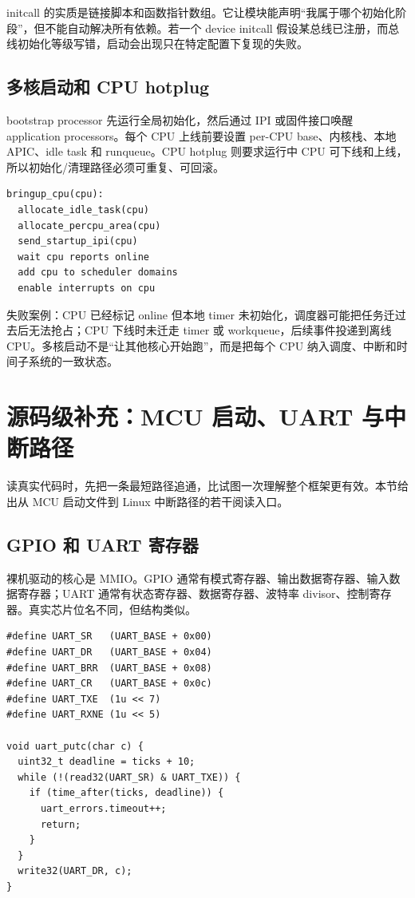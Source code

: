 initcall 的实质是链接脚本和函数指针数组。它让模块能声明“我属于哪个初始化阶段”，但不能自动解决所有依赖。若一个 device initcall 假设某总线已注册，而总线初始化等级写错，启动会出现只在特定配置下复现的失败。

\subsection{多核启动和 CPU hotplug}

bootstrap processor 先运行全局初始化，然后通过 IPI 或固件接口唤醒 application processors。每个 CPU 上线前要设置 per-CPU base、内核栈、本地 APIC、idle task 和 runqueue。CPU hotplug 则要求运行中 CPU 可下线和上线，所以初始化/清理路径必须可重复、可回滚。

\begin{lstlisting}
bringup_cpu(cpu):
  allocate_idle_task(cpu)
  allocate_percpu_area(cpu)
  send_startup_ipi(cpu)
  wait cpu reports online
  add cpu to scheduler domains
  enable interrupts on cpu
\end{lstlisting}

失败案例：CPU 已经标记 online 但本地 timer 未初始化，调度器可能把任务迁过去后无法抢占；CPU 下线时未迁走 timer 或 workqueue，后续事件投递到离线 CPU。多核启动不是“让其他核心开始跑”，而是把每个 CPU 纳入调度、中断和时间子系统的一致状态。

\section{源码级补充：MCU 启动、UART 与中断路径}

读真实代码时，先把一条最短路径追通，比试图一次理解整个框架更有效。本节给出从 MCU 启动文件到 Linux 中断路径的若干阅读入口。

\subsection{GPIO 和 UART 寄存器}

裸机驱动的核心是 MMIO。GPIO 通常有模式寄存器、输出数据寄存器、输入数据寄存器；UART 通常有状态寄存器、数据寄存器、波特率 divisor、控制寄存器。真实芯片位名不同，但结构类似。

\begin{lstlisting}
#define UART_SR   (UART_BASE + 0x00)
#define UART_DR   (UART_BASE + 0x04)
#define UART_BRR  (UART_BASE + 0x08)
#define UART_CR   (UART_BASE + 0x0c)
#define UART_TXE  (1u << 7)
#define UART_RXNE (1u << 5)

void uart_putc(char c) {
  uint32_t deadline = ticks + 10;
  while (!(read32(UART_SR) & UART_TXE)) {
    if (time_after(ticks, deadline)) {
      uart_errors.timeout++;
      return;
    }
  }
  write32(UART_DR, c);
}
\end{lstlisting}

